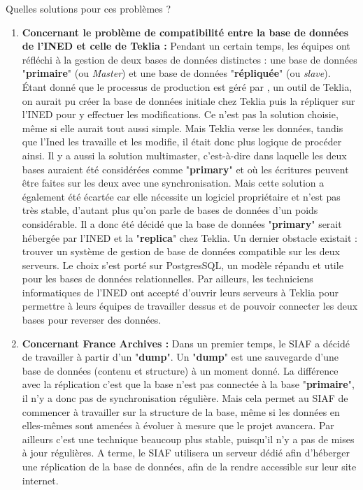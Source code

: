 Quelles solutions pour ces problèmes ? 
\begin{enumerate}[label=\alph*)]
    \item \textbf{Concernant le problème de compatibilité entre la base de données de l’INED et celle de Teklia :} 
Pendant un certain temps, les équipes ont réfléchi à la gestion de deux bases de données distinctes : une base de données "\textbf{primaire}" (ou \textit{Master}) et une base de données "\textbf{répliquée}" (ou \textit{slave}). Étant donné que le processus de production est géré par \Arkindex{}, un outil de Teklia, on aurait pu créer la base de données initiale chez Teklia puis la répliquer sur l'INED pour y effectuer les modifications. Ce n'est pas la solution choisie, même si elle aurait tout aussi simple. Mais Teklia verse les données, tandis que l'Ined les travaille et les modifie, il était donc plus logique de procéder ainsi.  
Il y a aussi la solution multimaster, c’est-à-dire dans laquelle les deux bases auraient été considérées comme "\textbf{primary}" et où les écritures peuvent être faites sur les deux avec une synchronisation. Mais cette solution a également été écartée car elle nécessite un logiciel propriétaire et n’est pas très stable, d’autant plus qu’on parle de bases de données d’un poids considérable. 
Il a donc été décidé que la base de données "\textbf{primary}" serait hébergée par l’INED et la "\textbf{replica}" chez Teklia. Un dernier obstacle existait : trouver un système de gestion de base de données compatible sur les deux serveurs. Le choix s’est porté sur PostgresSQL, un modèle répandu et utile pour les bases de données relationnelles. Par ailleurs, les techniciens informatiques de l’INED ont accepté d’ouvrir leurs serveurs à Teklia pour permettre à leurs équipes de travailler dessus et de pouvoir connecter les deux bases pour reverser des données. 
    \item \textbf{Concernant France Archives :}
Dans un premier temps, le SIAF a décidé de travailler à partir d’un "\textbf{dump}". Un "\textbf{dump}" est une sauvegarde d’une base de données (contenu et structure) à un moment donné. La différence avec la réplication c’est que la base n’est pas connectée à la base "\textbf{primaire}", il n’y a donc pas de synchronisation régulière. Mais cela permet au SIAF de commencer à travailler sur la structure de la base, même si les données en elles-mêmes sont amenées à évoluer à mesure que le projet avancera. Par ailleurs c’est une technique beaucoup plus stable, puisqu’il n’y a pas de mises à jour régulières. A terme, le SIAF utilisera un serveur dédié afin d’héberger une réplication de la base de données, afin de la rendre accessible sur leur site internet. 

\end{enumerate}
